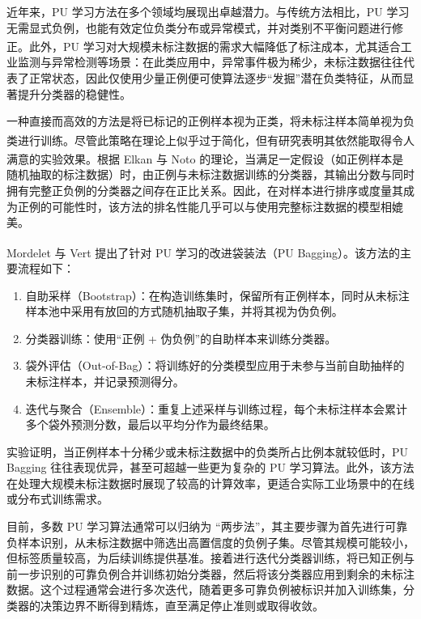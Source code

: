 近年来，PU 学习方法在多个领域均展现出卓越潜力。与传统方法相比，PU 学习无需显式负例，也能有效定位负类分布或异常模式，并对类别不平衡问题进行修正\textsuperscript{\cite{elkan2008learning}}。此外，PU 学习对大规模未标注数据的需求大幅降低了标注成本，尤其适合工业监测与异常检测等场景：在此类应用中，异常事件极为稀少，未标注数据往往代表了正常状态，因此仅使用少量正例便可使算法逐步“发掘”潜在负类特征，从而显著提升分类器的稳健性。

一种直接而高效的方法是将已标记的正例样本视为正类，将未标注样本简单视为负类进行训练\textsuperscript{\cite{elkan2008learning}}。尽管此策略在理论上似乎过于简化，但有研究表明其依然能取得令人满意的实验效果。根据 Elkan 与 Noto\textsuperscript{\cite{elkan2008learning}} 的理论，当满足一定假设（如正例样本是随机抽取的标注数据）时，由正例与未标注数据训练的分类器，其输出分数与同时拥有完整正负例的分类器之间存在正比关系。因此，在对样本进行排序或度量其成为正例的可能性时，该方法的排名性能几乎可以与使用完整标注数据的模型相媲美。

Mordelet 与 Vert\textsuperscript{\cite{mordelet2013bagging}} 提出了针对 PU 学习的改进袋装法（PU Bagging）。该方法的主要流程如下：
\begin{enumerate}
	\item 自助采样（Bootstrap）：在构造训练集时，保留所有正例样本，同时从未标注样本池中采用有放回的方式随机抽取子集，并将其视为伪负例。
	\item 分类器训练：使用“正例 + 伪负例”的自助样本来训练分类器。
	\item 袋外评估（Out-of-Bag）：将训练好的分类模型应用于未参与当前自助抽样的未标注样本，并记录预测得分。
	\item 迭代与聚合（Ensemble）：重复上述采样与训练过程，每个未标注样本会累计多个袋外预测分数，最后以平均分作为最终结果。
\end{enumerate}


实验证明，当正例样本十分稀少或未标注数据中的负类所占比例本就较低时，PU Bagging 往往表现优异，甚至可超越一些更为复杂的 PU 学习算法。此外，该方法在处理大规模未标注数据时展现了较高的计算效率，更适合实际工业场景中的在线或分布式训练需求。

目前，多数 PU 学习算法通常可以归纳为 “两步法”，其主要步骤为首先进行可靠负样本识别，从未标注数据中筛选出高置信度的负例子集。尽管其规模可能较小，但标签质量较高，为后续训练提供基准。接着进行迭代分类器训练，将已知正例与前一步识别的可靠负例合并训练初始分类器，然后将该分类器应用到剩余的未标注数据。这个过程通常会进行多次迭代，随着更多可靠负例被标识并加入训练集，分类器的决策边界不断得到精炼，直至满足停止准则或取得收敛。

